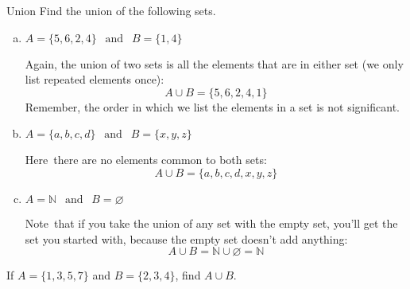 \begin{example}[https://www.youtube.com/watch?v=9jNZnZEBeqQ]{Union}
Find the union of the following sets.
\begin{enumerate}[(a)]
\item $A = \{5,6,2,4\} \ \ \textrm{ and } \ \ B = \{1,4\}$

Again\sol , the union of two sets is all the elements that are in either set (we only list repeated elements once):
\[A \cup B = \{5,6,2,4,1\}\]  Remember, the order in which we list the elements in a set is not significant.

\item $A = \{a,b,c,d\} \ \ \textrm{ and } \ \ B = \{x,y,z\}$

Here\sol\ there are no elements common to both sets:
\[A \cup B = \{a, b, c, d, x, y, z\}\]

\item $A = \mathbb{N} \ \ \textrm{ and } \ \ B = \varnothing$

Note\sol\ that if you take the union of any set with the empty set, you'll get the set you started with, because the empty set doesn't add anything:
\[A \cup B = \mathbb{N} \cup \varnothing = \mathbb{N}\]
\end{enumerate}
\end{example}

\begin{try}
If $A=\{1,3,5,7\}$ and $B=\{2,3,4\}$, find $A \cup B$.
\end{try}
\vfill
\pagebreak

